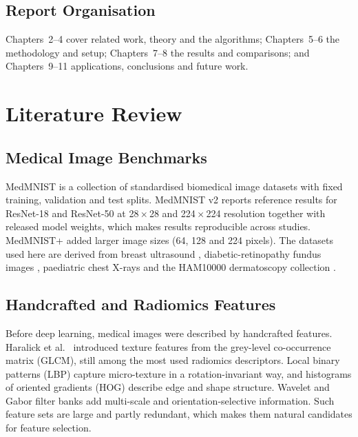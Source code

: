 \documentclass[12pt,a4paper]{report}
\begin{document}
\section{Report Organisation}
Chapters~2--4 cover related work, theory and the algorithms; Chapters~5--6 the methodology and setup;
Chapters~7--8 the results and comparisons; and Chapters~9--11 applications, conclusions and future work.

\chapter{Literature Review}

\section{Medical Image Benchmarks}
MedMNIST \cite{yang2021, yang2023} is a collection of standardised biomedical image datasets with fixed training,
validation and test splits. MedMNIST v2 reports reference results for ResNet-18 and ResNet-50 at 28\,$\times$\,28
and 224\,$\times$\,224 resolution together with released model weights, which makes results reproducible across
studies. MedMNIST+ \cite{doerrich2024} added larger image sizes (64, 128 and 224 pixels). The datasets used here are
derived from breast ultrasound \cite{aldhabyani2020}, diabetic-retinopathy fundus images \cite{liu2022}, paediatric
chest X-rays \cite{kermany2018} and the HAM10000 dermatoscopy collection \cite{tschandl2018}.

\section{Handcrafted and Radiomics Features}
Before deep learning, medical images were described by handcrafted features. Haralick et al.\ \cite{haralick1973}
introduced texture features from the grey-level co-occurrence matrix (GLCM), still among the most used radiomics
descriptors. Local binary patterns (LBP) \cite{ojala2002} capture micro-texture in a rotation-invariant way, and
histograms of oriented gradients (HOG) \cite{dalal2005} describe edge and shape structure. Wavelet and Gabor filter
banks add multi-scale and orientation-selective information. Such feature sets are large and partly redundant, which
makes them natural candidates for feature selection.
\end{document}

